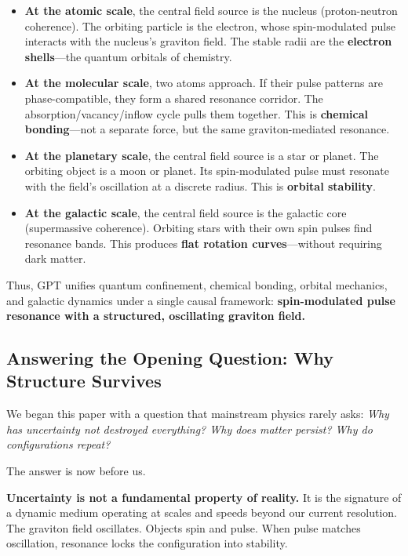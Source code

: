 \documentclass[12pt, a4paper]{article}
\begin{document}
\begin{itemize}
    \item \textbf{At the atomic scale}, the central field source is the nucleus (proton-neutron coherence). The orbiting particle is the electron, whose spin-modulated pulse interacts with the nucleus's graviton field. The stable radii are the \textbf{electron shells}—the quantum orbitals of chemistry.
    
    \item \textbf{At the molecular scale}, two atoms approach. If their pulse patterns are phase-compatible, they form a shared resonance corridor. The absorption/vacancy/inflow cycle pulls them together. This is \textbf{chemical bonding}—not a separate force, but the same graviton-mediated resonance.
    
    \item \textbf{At the planetary scale}, the central field source is a star or planet. The orbiting object is a moon or planet. Its spin-modulated pulse must resonate with the field's oscillation at a discrete radius. This is \textbf{orbital stability}.
    
    \item \textbf{At the galactic scale}, the central field source is the galactic core (supermassive coherence). Orbiting stars with their own spin pulses find resonance bands. This produces \textbf{flat rotation curves}—without requiring dark matter.
\end{itemize}

Thus, GPT unifies quantum confinement, chemical bonding, orbital mechanics, and galactic dynamics under a single causal framework: \textbf{spin-modulated pulse resonance with a structured, oscillating graviton field.}

\subsection{Answering the Opening Question: Why Structure Survives}
\label{subsec:why_structure_survives}

We began this paper with a question that mainstream physics rarely asks: \textit{Why has uncertainty not destroyed everything? Why does matter persist? Why do configurations repeat?}

The answer is now before us.

\textbf{Uncertainty is not a fundamental property of reality.} It is the signature of a dynamic medium operating at scales and speeds beyond our current resolution. The graviton field oscillates. Objects spin and pulse. When pulse matches oscillation, resonance locks the configuration into stability.
\end{document}
